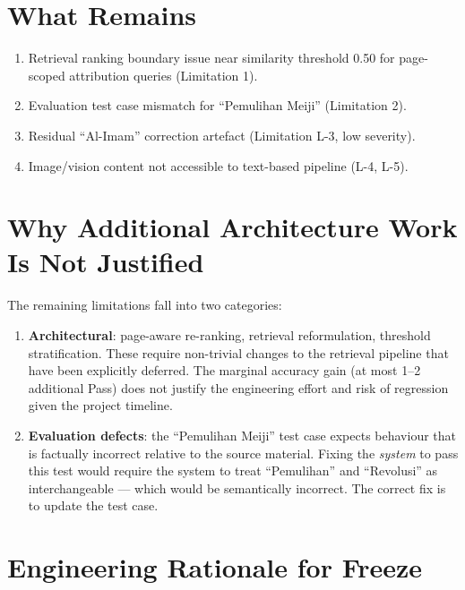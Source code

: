 \documentclass[12pt, a4paper]{report}
\begin{document}
\section{What Remains}

\begin{enumerate}[noitemsep]
  \item Retrieval ranking boundary issue near similarity threshold 0.50 for
        page-scoped attribution queries (Limitation 1).
  \item Evaluation test case mismatch for ``Pemulihan Meiji'' (Limitation 2).
  \item Residual ``Al-Imam'' correction artefact (Limitation L-3, low severity).
  \item Image/vision content not accessible to text-based pipeline (L-4, L-5).
\end{enumerate}

\section{Why Additional Architecture Work Is Not Justified}

The remaining limitations fall into two categories:

\begin{enumerate}
  \item \textbf{Architectural}: page-aware re-ranking, retrieval reformulation,
        threshold stratification. These require non-trivial changes to the
        retrieval pipeline that have been explicitly deferred. The marginal
        accuracy gain (at most 1--2 additional Pass) does not justify the
        engineering effort and risk of regression given the project timeline.

  \item \textbf{Evaluation defects}: the ``Pemulihan Meiji'' test case expects
        behaviour that is factually incorrect relative to the source material.
        Fixing the \emph{system} to pass this test would require the system to
        treat ``Pemulihan'' and ``Revolusi'' as interchangeable — which would be
        semantically incorrect. The correct fix is to update the test case.
\end{enumerate}

\section{Engineering Rationale for Freeze}
\end{document}
